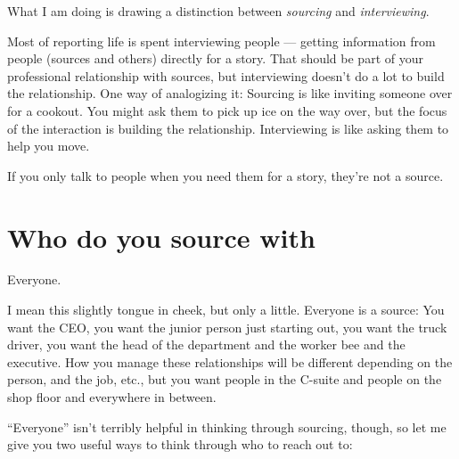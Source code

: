 \documentclass[
  11pt,
  american,
  letterpaperpaper,
  extrafontsizes,onecolumn,openright
  ]{memoir}
\begin{document}
What I am doing is drawing a distinction between \emph{sourcing} and \emph{interviewing}.

Most of reporting life is spent interviewing people --- getting information from people (sources and others) directly for a story. That should be part of your professional relationship with sources, but interviewing doesn't do a lot to build the relationship. One way of analogizing it: Sourcing is like inviting someone over for a cookout. You might ask them to pick up ice on the way over, but the focus of the interaction is building the relationship. Interviewing is like asking them to help you move.

If you only talk to people when you need them for a story, they're not a source.

\hypertarget{who-do-you-source-with}{%
\section*{Who do you source with}\label{who-do-you-source-with}}

Everyone.

I mean this slightly tongue in cheek, but only a little. Everyone is a source: You want the CEO, you want the junior person just starting out, you want the truck driver, you want the head of the department and the worker bee and the executive. How you manage these relationships will be different depending on the person, and the job, etc., but you want people in the C-suite and people on the shop floor and everywhere in between.

\enquote{Everyone} isn't terribly helpful in thinking through sourcing, though, so let me give you two useful ways to think through who to reach out to:
\end{document}
